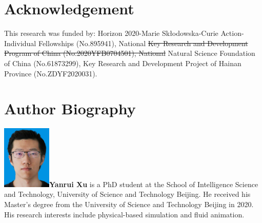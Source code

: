 \documentclass[VANCOUVER,STIX1COL]{WileyNJD-v2}
\providecommand{\DIFdel}[1]{{\protect\color{red}\sout{#1}}}                      %
\providecommand{\DIFaddbegin}{} %
\providecommand{\DIFaddend}{} %
\providecommand{\DIFdelbegin}{} %
\providecommand{\DIFdelend}{} %
\begin{document}
\section*{Acknowledgement}
This research was funded by: Horizon 2020-Marie Skłodowska-Curie Action-Individual Fellowships (No.895941), National \DIFdelbegin \DIFdel{Key Research and Development Program of China (No.2020YFB0704501), National }\DIFdelend Natural Science Foundation of China (No.61873299), Key Research and Development Project of Hainan Province (No.ZDYF2020031).

\nocite{*}%


\section*{Author Biography}

\DIFdelbegin %
\DIFdelend \DIFaddbegin \begin{biography}{\includegraphics[width=66pt,height=86pt]{VANCOUVER/figure/photos/YanruiXu.jpg}}{\textbf{Yanrui Xu} is a PhD student at the School of Intelligence Science and Technology, University of Science and Technology Beijing. 
    He received his Master's degree from the University of Science and Technology Beijing in 2020. 
    His research interests include physical-based simulation and fluid animation.}
\DIFaddend \end{biography}

\vspace{7ex}
\end{document}

